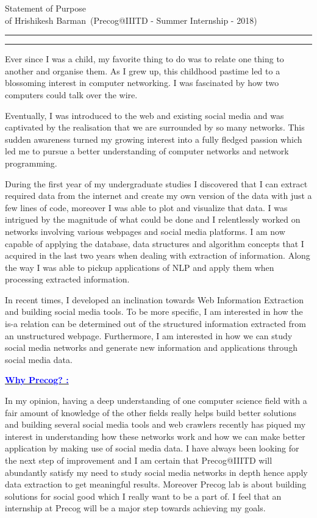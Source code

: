 \documentclass{article}
\newcommand{\soptitle}{Statement of Purpose}
\newcommand{\yourname}{Hrishikesh Barman}
\newcommand{\statement}[1]{\par\medskip
  \underline{\textcolor{blue}{\textbf{#1}}}\space
}
\begin{document}
\begin{center}\LARGE\soptitle\\
        \large of \yourname\ (Precog@IIITD - Summer Internship - 2018)
\end{center}

\hrule
\vspace{1pt}
\hrule height 1pt

\bigskip
Ever since I was a child, my favorite thing to do was to relate one thing to another and organise them. As I grew up, this childhood pastime led to a blossoming interest in computer networking. I was fascinated by how two computers could talk over the wire. 

Eventually, I was introduced to the web and existing social media and was captivated by the realisation that we are surrounded by so many networks. This sudden awareness turned my growing interest into a fully fledged passion which led me to pursue a better understanding of computer networks and network programming.

\vspace{2mm}

During the first year of my undergraduate studies I discovered that I can extract required data from the internet and create my own version of the data with just a few lines of code, moreover I was able to plot and visualize that data.
I was intrigued by the magnitude of what could be done and I relentlessly worked on networks involving various webpages and social media platforms.
I am now capable of applying the database, data structures and algorithm concepts that I acquired in the last two years when dealing with
extraction of information. Along the way I was able to pickup applications of NLP and apply them when processing extracted information.

\vspace{2mm}
In recent times, I developed an inclination towards Web Information Extraction and building social media tools.
To be more specific, I am interested in how the is-a relation can be determined out of the structured information
extracted from an unstructured webpage. Furthermore, I am interested in how we can study social media networks and generate new information and applications through social media data.

\statement{Why Precog? :}
In my opinion, having a deep understanding of one computer science field with a fair amount of knowledge of the other fields
really helps build better solutions and building several social media tools and web crawlers
recently has piqued my interest in understanding how these networks work and how we can make better application by making use
of social media data. I have always been looking for the next step of improvement and I am certain that Precog@IIITD will 
abundantly satisfy my need to study social media networks in depth hence apply data extraction to get meaningful results.
Moreover Precog lab is about building solutions for social good which I really want to be a part of. 
I feel that an internship at Precog will be a major step towards achieving my goals.
\end{document}
